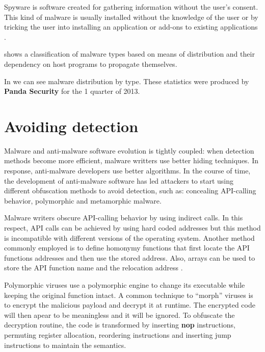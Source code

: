 Spyware is software created for gathering information without the user's consent. This kind of malware is usually installed without the knowledge of the user or by tricking the user into installing an application or add-ons to existing applications \cite{mal-behavior-analysis}.


 shows a classification of malware types based on means of distribution and their dependency on host programs to propagate themselves.


In  we can see malware distribution by type. These statistics were produced by \textbf{Panda Security} for the 1 quarter of 2013. 


\section{Avoiding detection}
\label{sec:avoid-det}

Malware and anti-malware software evolution is tightly coupled: when detection methods become more efficient, malware writters use better hiding techniques. In response, anti-malware developers use better algorithms. In the course of time, the development of anti-malware software has led attackers to start using different obfuscation methods to avoid detection, such as: concealing API-calling behavior, polymorphic and metamorphic malware.

Malware writers obscure API-calling behavior by using indirect calls. In this respect, API calls can be achieved by using hard coded addresses but this method is incompatible with different versions of the operating system. Another method commonly employed is to define homonymy functions that first locate the API functions addresses and then use the stored address. Also, arrays can be used to store the API function name and the relocation address \cite{static-detection-behavior}.

Polymorphic viruses use a polymorphic engine to change its executable while keeping the original function intact. A common technique to ``morph'' viruses is to encrypt the malicious payload and decrypt it at runtime. The encrypted code will then apear to be meaningless and it will be ignored. To obfuscate the decryption routine, the code is transformed by inserting \textbf{nop} instructions, permuting register allocation, reordering instructions and inserting jump instructions to maintain the semantics.

